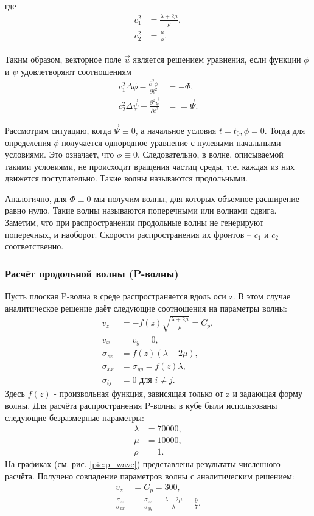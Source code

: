 где 
\begin{align}
c_1^2 &= \frac{\lambda+2\mu}{\rho}, \nonumber\\
c_2^2 &= \frac{\mu}{\rho}.
\end{align}

Таким образом, векторное поле $\vec{u}$ является решением уравнения, если функции $\phi$ и $\psi$ удовлетворяют соотношениям
\begin{align}
c_1^2\Delta\phi - \frac{\partial^2 \phi}{\partial t^2} &= -\Phi, \\
c_2^2\Delta\vec{\psi} - \frac{\partial^2 \vec{\psi}}{\partial t^2} &= =\vec{\Psi}.
\end{align}

Рассмотрим ситуацию, когда $\vec{\Psi} \equiv 0$, а начальное условия $t = t_0, \phi = 0$. Тогда для определения $\phi$ получается однородное уравнение с нулевыми начальными условиями. Это означает, что $\phi \equiv 0$. Следовательно, в волне, описываемой такими условиями, не происходит вращения частиц среды, т.е. каждая из них движется поступательно. Такие волны называются продольными.

Аналогично, для $\Phi \equiv 0$ мы получим волны, для которых объемное расширение равно нулю. Такие волны называются поперечными или волнами сдвига. Заметим, что при распространении продольные волны не генерируют поперечных, и наоборот. Скорости распространения их фронтов -- $c_1$ и $c_2$ соответственно.


\subsubsection{Расчёт продольной волны (P-волны)}
Пусть плоская P-волна в среде распространяется вдоль оси z. В этом случае аналитическое решение даёт следующие соотношения на параметры волны:
\begin{align}
v_z&=-f(z)\sqrt{\frac{\lambda+2\mu}{\rho}}=C_p, \nonumber\\
v_x&=v_y=0, \nonumber\\
\sigma_{zz}&=f(z)(\lambda+2\mu), \nonumber\\
\sigma_{xx}&=\sigma_{yy}=f(z)\lambda, \nonumber\\
\sigma_{ij}&=0 \textrm{ для } i \neq j.
\end{align}
Здесь $f(z)$ - произвольная функция, зависящая только от z и задающая форму волны.
Для расчёта распространения P-волны в кубе были использованы следующие безразмерные параметры: 
\begin{align}
\lambda&=70000, \nonumber\\
\mu&=10000, \nonumber\\
\rho&=1.
\end{align}
На графиках (см. рис. \ref{pic:p_wave}) представлены результаты численного расчёта. Получено совпадение параметров волны с аналитическим решением:
\begin{align}
v_z&=C_p=300, \nonumber\\
\frac{\sigma_{zz}}{\sigma_{xx}}&=\frac{\sigma_{zz}}{\sigma_{yy}}=\frac{\lambda+2\mu}{\lambda}=\frac{9}{7}.
\end{align}

